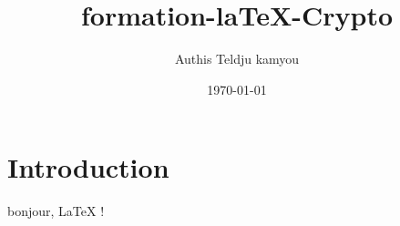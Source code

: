 \documentclass{article}
\title{formation-laTeX-Crypto}
\author{Authis Teldju kamyou}
\date{\today}
\begin{document}
\maketitle

\section{Introduction}
bonjour, \LaTeX{} !
\end{document}
